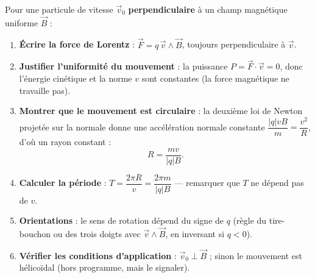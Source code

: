 \documentclass[11pt]{article}
\begin{document}
\begin{methode}
Pour une particule de vitesse $\vec{v}_0$ \textbf{perpendiculaire} à un champ magnétique uniforme $\vec{B}$ :
\begin{enumerate}
\item \textbf{Écrire la force de Lorentz} : $\vec{F}=q\,\vec{v}\wedge\vec{B}$, toujours perpendiculaire à $\vec{v}$.
\item \textbf{Justifier l'uniformité du mouvement} : la puissance $P=\vec{F}\cdot\vec{v}=0$, donc l'énergie cinétique et la norme $v$ sont constantes (la force magnétique ne travaille pas).
\item \textbf{Montrer que le mouvement est circulaire} : la deuxième loi de Newton projetée sur la normale donne une accélération normale constante $\dfrac{|q|vB}{m}=\dfrac{v^2}{R}$, d'où un rayon constant :
\[ R=\dfrac{mv}{|q|B}. \]
\item \textbf{Calculer la période} : $T=\dfrac{2\pi R}{v}=\dfrac{2\pi m}{|q|B}$ — remarquer que $T$ ne dépend pas de $v$.
\item \textbf{Orientations} : le sens de rotation dépend du signe de $q$ (règle du tire-bouchon ou des trois doigts avec $\vec{v}\wedge\vec{B}$, en inversant si $q<0$).
\item \textbf{Vérifier les conditions d'application} : $\vec{v}_0\perp\vec{B}$ ; sinon le mouvement est hélicoïdal (hors programme, mais le signaler).
\end{enumerate}
\end{methode}
\end{document}
